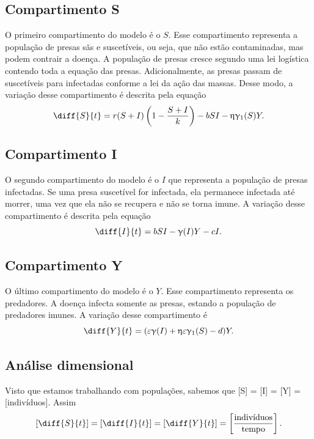 \documentclass{article}
\begin{document}
\subsection{Compartimento S}
O primeiro compartimento do modelo é o $S$. Esse compartimento representa a população de presas sãs e suscetíveis, ou seja, que não estão contaminadas, mas podem contrair a doença. A população de presas cresce segundo uma lei logística contendo toda a equação das presas. Adicionalmente, as presas passam de suscetíveis para infectadas conforme a lei da ação das massas. Desse modo, a variação desse compartimento é descrita pela equação
\begin{equation*}
    \diff{S}{t} = r(S+I) \left( 1 - \dfrac{S+I}{k} \right) - bSI - \upeta \upgamma_1(S)Y.
\end{equation*}

\subsection{Compartimento I}
O segundo compartimento do modelo é o $I$ que representa a população de presas infectadas. Se uma presa suscetível for infectada, ela permanece infectada até morrer, uma vez que ela não se recupera e não se torna imune. A variação desse compartimento é descrita pela equação
\begin{equation*}
    \diff{I}{t} = bSI - \upgamma(I)Y - cI.
\end{equation*}

\subsection{Compartimento Y}
O último compartimento do modelo é o $Y$. Esse compartimento representa  os predadores. A doença infecta somente as presas, estando a população de predadores imunes. A variação desse compartimento é
\begin{equation*}
    \diff{Y}{t} = (\varepsilon \upgamma(I) + \upeta \varepsilon \upgamma_1(S) - d)Y.
\end{equation*}

\subsection{Análise dimensional}
Visto que estamos trabalhando com populações, sabemos que [S] = [I] = [Y] = [indivíduos]. Assim
\begin{equation*}
    \left[ \diff{S}{t} \right] = \left[ \diff{I}{t} \right] = \left[ \diff{Y}{t} \right] = \left[ \dfrac{\text{indivíduos}}{\text{tempo}}\right].
\end{equation*}
\end{document}
